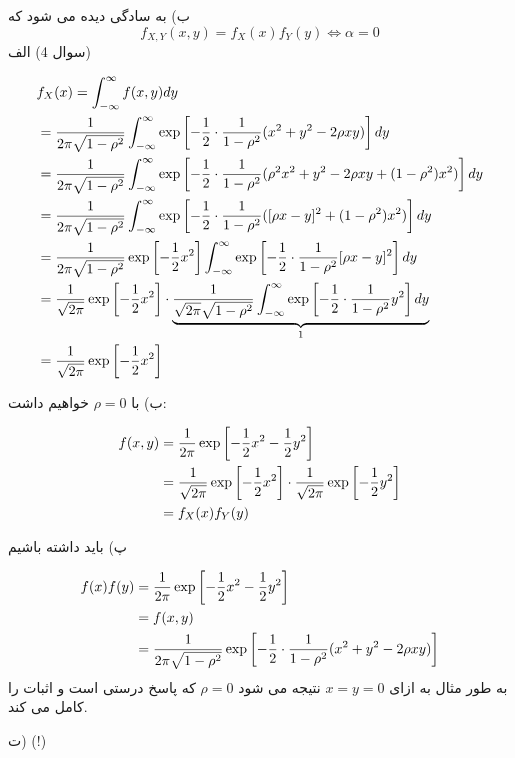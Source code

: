 \documentclass[10pt,letterpaper]{report}
\newcommand{\eqn}[1]{
\[\begin{split}
#1
\end{split}\]
}
\begin{document}
ب) به سادگی دیده می شود که 
$$
f_{X,Y}(x,y)=f_X(x)f_Y(y)\iff \alpha=0
$$
\newline\newline
سوال 4) الف)
\eqn{
&f_X(x)=\int_{-\infty}^{\infty} f(x,y)dy
\\&=
{1\over 2\pi \sqrt{1-\rho^2}}\int_{-\infty}^{\infty}\exp\left[-{1\over 2}\cdot{1\over 1-\rho^2}(x^2+y^2-2\rho xy)\right]dy
\\&=
{1\over 2\pi \sqrt{1-\rho^2}}\int_{-\infty}^{\infty}\exp\left[-{1\over 2}\cdot{1\over 1-\rho^2}(\rho^2x^2+y^2-2\rho xy+(1-\rho^2)x^2)\right]dy
\\&=
{1\over 2\pi \sqrt{1-\rho^2}}\int_{-\infty}^{\infty}\exp\left[-{1\over 2}\cdot{1\over 1-\rho^2}([\rho x-y]^2+(1-\rho^2)x^2)\right]dy
\\&=
{1\over 2\pi \sqrt{1-\rho^2}}\exp\left[-{1\over 2}x^2\right]\int_{-\infty}^{\infty}\exp\left[-{1\over 2}\cdot{1\over 1-\rho^2}[\rho x-y]^2\right]dy
\\&=
{1\over \sqrt{2\pi}}\exp\left[-{1\over 2}x^2\right]\cdot
\underbrace{
{1\over \sqrt{2\pi} \sqrt{1-\rho^2}}\int_{-\infty}^{\infty}\exp\left[-{1\over 2}\cdot{1\over 1-\rho^2}y^2\right]dy}_{1}
\\&=
{1\over \sqrt{2\pi}}\exp\left[-{1\over 2}x^2\right]
}{}

ب) با 
$
\rho=0
$
 خواهیم داشت:
\eqn{
f(x,y)&={1\over 2\pi}\exp\left[-{1\over 2}x^2-{1\over 2}y^2\right]
\\&
={1\over \sqrt{2\pi}}\exp\left[-{1\over 2}x^2\right]\cdot
{1\over \sqrt{2\pi}}\exp\left[-{1\over 2}y^2\right]
\\&=f_X(x)f_Y(y)
}{}

پ) باید داشته باشیم
\eqn{
f(x)f(y)&={1\over 2\pi}\exp\left[-{1\over 2}x^2-{1\over 2}y^2\right]
\\&
=f(x,y)
\\&=
{1\over 2\pi \sqrt{1-\rho^2}}\exp\left[-{1\over 2}\cdot{1\over 1-\rho^2}(x^2+y^2-2\rho xy)\right]
}{}
به طور مثال به ازای $x=y=0$ نتیجه می شود $\rho=0$ که پاسخ درستی است و اثبات را کامل می کند.

ت) (!)
\end{document}
